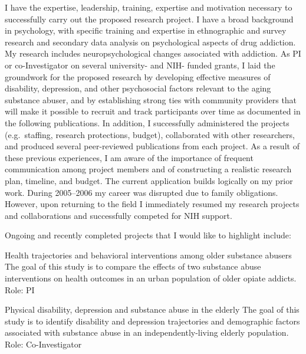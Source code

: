 \documentclass{nihbiosketch}
\begin{document}
\begin{statement}
I have the expertise, leadership, training, expertise and motivation necessary
to successfully carry out the proposed research project.  I have a broad
background in psychology, with specific training and expertise in ethnographic
and survey research and secondary data analysis on psychological aspects of
drug addiction.  My research includes neuropsychological changes associated
with addiction.  As PI or co-Investigator on several university- and NIH-
funded grants, I laid the groundwork for the proposed research by developing
effective measures of disability, depression, and other psychosocial factors
relevant to the aging substance abuser, and by establishing strong ties with
community providers that will make it possible to recruit and track
participants over time as documented in the following publications.  In
addition, I successfully administered the projects (e.g.\ staffing, research
protections, budget), collaborated with other researchers, and produced several
peer-reviewed publications from each project.  As a result of these previous
experiences, I am aware of the importance of frequent communication among
project members and of constructing a realistic research plan, timeline, and
budget.  The current application builds logically on my prior work. During
2005--2006 my career was disrupted due to family obligations. However, upon
returning to the field I immediately resumed my research projects and
collaborations and successfully competed for NIH support.

\bigskip

\noindent
Ongoing and recently completed projects that I would like to highlight include:

\bigskip

{Health trajectories and behavioral interventions among older substance abusers}
{The goal of this study is to compare the effects of two substance abuse interventions on health 
outcomes in an urban population of older opiate addicts.}
{Role: PI}

\bigskip

{Physical disability, depression and substance abuse in the elderly}
{The goal of this study is to identify disability and depression trajectories and demographic factors 
associated with substance abuse in an independently-living elderly population.}
{Role: Co-Investigator}

\bigskip


\end{statement}
\end{document}
